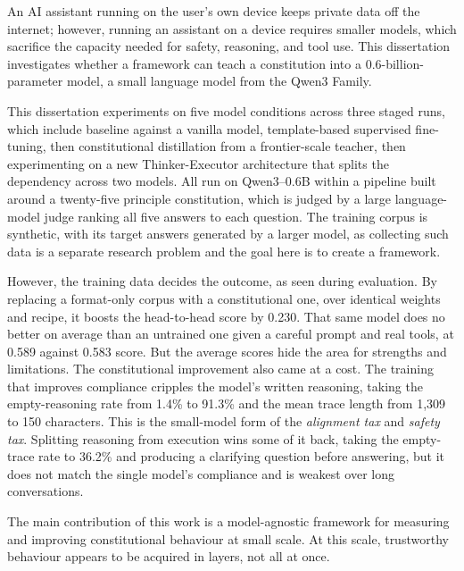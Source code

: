 \documentclass[a4paper, 12pt, oneside]{report}         %
\numberwithin{equation}{chapter}
\numberwithin{algorithm}{chapter}
\begin{document}
\begin{thesisabstract}

An AI assistant running on the user's own device keeps private data off the internet; however, running an assistant on a device requires smaller models, which sacrifice the capacity needed for safety, reasoning, and tool use. This dissertation investigates whether a framework can teach a constitution into a 0.6-billion-parameter model, a small language model from the Qwen3 Family.

This dissertation experiments on five model conditions across three staged runs, which include baseline against a vanilla model, template-based supervised fine-tuning, then constitutional distillation from a frontier-scale teacher, then experimenting on a new Thinker-Executor architecture that splits the dependency across two models. All run on Qwen3--0.6B within a pipeline built around a twenty-five principle constitution, which is judged by a large language-model judge ranking all five answers to each question. The training corpus is synthetic, with its target answers generated by a larger model, as collecting such data is a separate research problem and the goal here is to create a framework.

However, the training data decides the outcome, as seen during evaluation. By replacing a format-only corpus with a constitutional one, over identical weights and recipe, it boosts the head-to-head score by 0.230. That same model does no better on average than an untrained one given a careful prompt and real tools, at 0.589 against 0.583 score. But the average scores hide the area for strengths and limitations. The constitutional improvement also came at a cost. The training that improves compliance cripples the model's written reasoning, taking the empty-reasoning rate from 1.4\% to 91.3\% and the mean trace length from 1{,}309 to 150 characters. This is the small-model form of the \emph{alignment tax} and \emph{safety tax}. Splitting reasoning from execution wins some of it back, taking the empty-trace rate to 36.2\% and producing a clarifying question before answering, but it does not match the single model's compliance and is weakest over long conversations.

The main contribution of this work is a model-agnostic framework for measuring and improving constitutional behaviour at small scale. At this scale, trustworthy behaviour appears to be acquired in layers, not all at once.


\end{thesisabstract}
\end{document}
